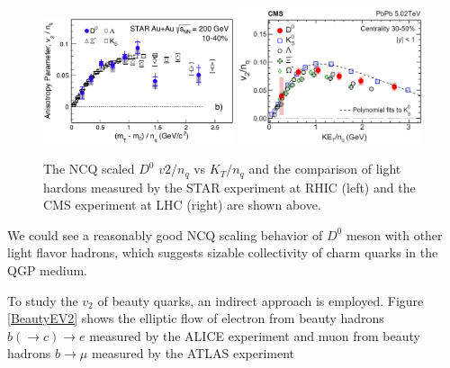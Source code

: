 \begin{figure}[hbtp]
\begin{center}
\includegraphics[width=0.50\textwidth]{Figures/Chapter2/STARv2.png}
\includegraphics[width=0.485\textwidth]{Figures/Chapter2/CMSv2.png}
\caption{The NCQ scaled $D^0$ $v2/n_q$ vs $K_T/n_q$ and the comparison of light hardons measured by the STAR experiment at RHIC (left) and the CMS experiment at LHC (right) are shown above.}
\label{HQV2}
\end{center}
\end{figure}   

We could see a reasonably good NCQ scaling behavior of $D^0$ meson with other light flavor hadrons, which suggests sizable collectivity of charm quarks in the QGP medium. 

To study the $v_2$ of beauty quarks, an indirect approach is employed. Figure \ref{BeautyEV2} shows the elliptic flow of electron from beauty hadrons $b (\rightarrow c) \rightarrow e$ measured by the ALICE experiment \cite{ALICENPElec} and muon from beauty hadrons $b \rightarrow \mu$ measured by the ATLAS experiment \cite{ATLASNPMuon}


